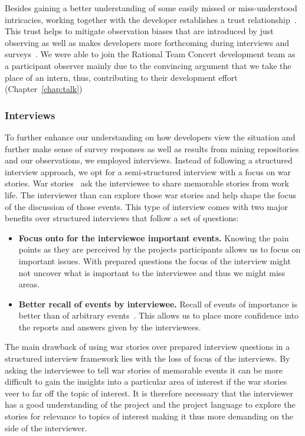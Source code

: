 Besides gaining a better understanding of some easily missed or miss-understood intricacies, working together with the developer establishes a trust relationship~\cite{letherbridge:ese2005}.
This trust helps to mitigate observation biases that are introduced by just observing as well as makes developers more forthcoming during interviews and surveys~\cite{letherbridge:ese2005}.
We were able to join the Rational Team Concert development team as a participant observer mainly due to the convincing argument that we take the place of an intern, thus, contributing to their development effort (Chapter~\ref{chap:talk})

\subsubsection{Interviews}
To further enhance our understanding on how developers view the situation and further make sense of survey responses as well as results from mining repositories and our observations, we employed interviews.
Instead of following a structured interview approach, we opt for a semi-structured interview with a focus on war stories.
War stories~\cite{lutters:ist:2007} ask the interviewee to share memorable stories from work life.
The interviewer than can explore those war stories and help shape the focus of the discussion of those events.
This type of interview comes with two major benefits over structured interviews that follow a set of questions:

\begin{itemize}
\item\textbf{Focus onto for the interviewee important events.}
Knowing the pain points as they are perceived by the projects participants allows us to focus on important issues.
With prepared questions the focus of the interview might not uncover what is important to the interviewee and thus we might miss areas.
\item\textbf{Better recall of events by interviewee.}
Recall of events of importance is better than of arbitrary events~\cite{lutters:ist:2007}.
This allows us to place more confidence into the reports and answers given by the interviewees.
\end{itemize}

The main drawback of using war stories over prepared interview questions in a structured interview framework lies with the loss of focus of the interviews.
By asking the interviewee to tell war stories of memorable events it can be more difficult to gain the insights into a particular area of interest if the war stories veer to far off the topic of interest.
It is therefore necessary that the interviewer has a good understanding of the project and the project language to explore the stories for relevance to topics of interest making it thus more demanding on the side of the interviewer.

